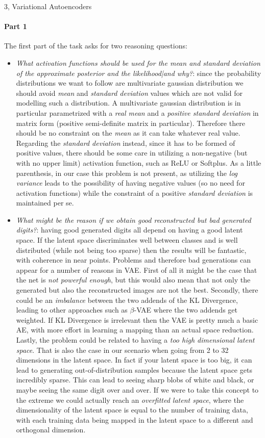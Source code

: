 \documentclass[10pt,a4paper]{article}
\begin{document}
\begin{task}{3, Variational Autoencoders}
\paragraph{Part 1}
The first part of the task asks for two reasoning questions:
\begin{itemize}
    \item \textit{What activation functions should be used for the mean and standard deviation of the approximate posterior
and the likelihood|and why?}: since the probability distributions we want to follow are multivariate gaussian distribution we should avoid \textit{mean} and \textit{standard deviation} values which are not valid for modelling such a distribution. A multivariate gaussian distribution is in particular parametrized with a \textit{real mean} and a \textit{positive standard deviation} in matrix form (positive semi-definite matrix in particular). Therefore there should be no constraint on the \textit{mean} as it can take whatever real value. Regarding the \textit{standard deviation} instead, since it has to be formed of positive values, there should be some care in utilizing a non-negative (but with no upper limit) activation function, such as ReLU or Softplus. As a little parenthesis, in our case this problem is not present, as utilizing the \textit{log variance} leads to the possibility of having negative values (so no need for activation functions) while the constraint of a positive \textit{standard deviation} is maintained per se.
    \item \textit{What might be the reason if we obtain good reconstructed but bad generated digits?}: having good generated digits all depend on having a good latent space. If the latent space discriminates well between classes and is well distributed (while not being too sparse) then the results will be fantastic, with coherence in near points. Problems and therefore bad generations can appear for a number of reasons in VAE. First of all it might be the case that the net is \textit{not powerful enough}, but this would also mean that not only the generated but also the reconstructed images are not the best. Secondly, there could be an \textit{imbalance} between the two addends of the KL Divergence, leading to other approaches such as $\beta$-VAE where the two addends get weighted. If KL Divergence is irrelevant then the VAE is pretty much a basic AE, with more effort in learning a mapping than an actual space reduction. Lastly, the problem could be related to having a \textit{too high dimensional latent space}. That is also the case in our scenario when going from 2 to 32 dimensions in the latent space. In fact if your latent space is too big, it can lead to generating out-of-distribution samples because the latent space gets incredibly sparse. This can lead to seeing sharp blobs of white and black, or maybe seeing the same digit over and over. If we were to take this concept to the extreme we could actually reach an \textit{overfitted latent space}, where the dimensionality of the latent space is equal to the number of training data, with each training data being mapped in the latent space to a different and orthogonal dimension.
\end{itemize}


\end{task}
\end{document}
